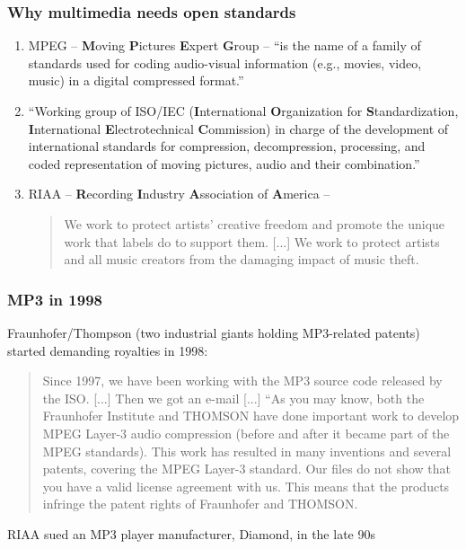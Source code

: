 \documentclass{beamer}
\begin{document}
\begin{frame}
	\frametitle{Why multimedia needs open standards}
	\begin{enumerate}
		\item
			MPEG -- \textbf{M}oving \textbf{P}ictures \textbf{E}xpert \textbf{G}roup -- ``is the name of a family of standards used for coding audio-visual information (e.g., movies, video, music) in a digital compressed format.''
		\item
			``Working group of ISO/IEC (\textbf{I}nternational \textbf{O}rganization for \textbf{S}tandardization, \textbf{I}nternational \textbf{E}lectrotechnical \textbf{C}ommission) in charge of the development of international standards for compression, decompression, processing, and coded representation of moving pictures, audio and their combination.''
		\item
			RIAA -- \textbf{R}ecording \textbf{I}ndustry \textbf{A}ssociation of \textbf{A}merica -- 
			\begin{quote}
				We work to protect artists' creative freedom and promote the unique work that labels do to support them. [...] We work to protect artists and all music creators from the damaging impact of music theft. 
			\end{quote}
	\end{enumerate}
\end{frame}

\begin{frame}
	\frametitle{MP3 in 1998}
	Fraunhofer/Thompson (two industrial giants holding MP3-related patents) started demanding royalties in 1998:
	\begin{quote}
		Since 1997, we have been working with the MP3 source code released by the ISO. [...] Then we got an e-mail [...] ``As you may know, both the Fraunhofer Institute and THOMSON have done important work to develop MPEG Layer-3 audio compression (before and after it became part of the MPEG standards). This work has resulted in many inventions and several patents, covering the MPEG Layer-3 standard. Our files do not show that you have a valid license agreement with us. This means that the products infringe the patent rights of Fraunhofer and THOMSON.
	\end{quote}
	RIAA sued an MP3 player manufacturer, Diamond, in the late 90s
\end{frame}

\end{document}
